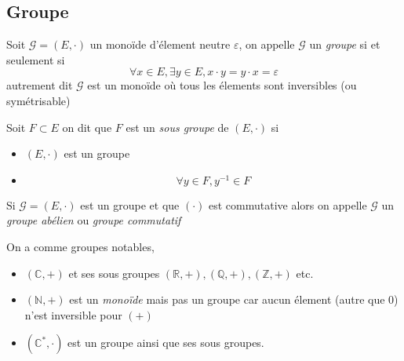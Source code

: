 \documentclass[11pt,colorlinks]{book}
\theoremstyle{mytheoremstyle}
\theoremstyle{mytheoremstyle}
\theoremstyle{mytheoremstyle}
\theoremstyle{mytheoremstyle}
\theoremstyle{mytheoremstyle}
\theoremstyle{mytheoremstyle}
\theoremstyle{mytheoremstyle}
\theoremstyle{mytheoremstyle}
\theoremstyle{myproblemstyle}
\def\mbb#1{\mathbb{#1}}
\def\bN{\mbb{N}}
\def\bC{\mbb{C}}
\def\bR{\mbb{R}}
\def\bQ{\mbb{Q}}
\def\bZ{\mbb{Z}}
\begin{document}
\subsection{Groupe}
\begin{definition}
  Soit $\mathcal G = (E,\cdot)$ un monoïde d'élement neutre $\varepsilon$, on appelle $\mathcal G$ un \textit{groupe} si et seulement si 
  \begin{equation*}
    \forall x \in E, \exists y \in E, x \cdot y = y \cdot x = \varepsilon
  \end{equation*}
  autrement dit $\mathcal G$ est un monoïde où tous les élements sont inversibles (ou symétrisable)
\end{definition}
\begin{definition}
  Soit $F \subset E$ on dit que $F$ est un \textit{sous groupe} de $(E,\cdot)$ si
  \begin{itemize}
    \item $(E,\cdot)$ est un groupe
    \item \begin{equation*}
      \forall y \in F, y^{-1} \in F
    \end{equation*}
  \end{itemize}
\end{definition}
\begin{rmq}
  Si $\mathcal G = (E,\cdot)$ est un groupe et que $(\cdot)$ est commutative alors on appelle $\mathcal G$ un \textit{groupe abélien} ou \textit{groupe commutatif}
\end{rmq}
\begin{ex}
  On a comme groupes notables,
  \begin{itemize}
    \item $(\bC,+)$ et ses sous groupes $(\bR,+),(\bQ,+),(\bZ,+)$ etc. 
    \item $(\bN,+)$ est un \textit{monoïde} mais pas un groupe car aucun élement (autre que $0$) n'est inversible pour $(+)$
    \item $(\bC^*,\cdot)$ est un groupe ainsi que ses sous groupes.
  \end{itemize}
\end{ex}
\end{document}
